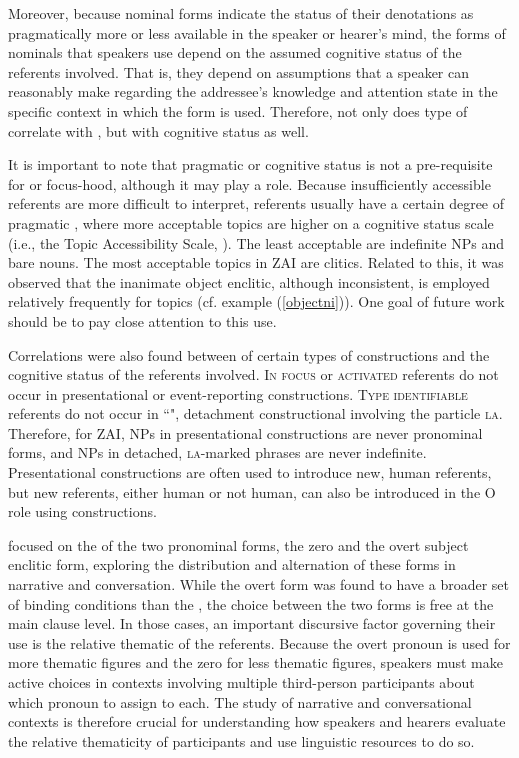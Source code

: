 Moreover, because nominal forms indicate the status of their denotations as pragmatically more or less available in the speaker or hearer's mind, the forms of nominals that speakers use depend on the assumed cognitive status of the referents involved. That is, they depend on assumptions that a speaker can reasonably make regarding the addressee's knowledge and attention state in the specific context in which the form is used. Therefore, not only does type of  correlate with , but with cognitive status as well. 

It is important to note that pragmatic or cognitive status is not a pre-requisite for  or focus-hood, although it may play a role. Because insufficiently accessible  referents are more difficult to interpret,  referents usually have a certain degree of pragmatic , where more acceptable topics are higher on a cognitive status scale (i.e., the Topic Accessibility Scale, \citealt{lambrecht1994}). The least acceptable are indefinite NPs and bare nouns. The most acceptable topics in ZAI are clitics. Related to this, it was observed that the inanimate object enclitic, although inconsistent, is employed relatively frequently for topics (cf. example (\ref{objectni})). One goal of future work should be to pay close attention to this use.

Correlations were also found between  of certain types of constructions and the cognitive status of the referents involved. \textsc{In focus} \citep{gundel1993} or \textsc{activated} referents do not occur in presentational or event-reporting constructions. \textsc{Type identifiable} referents do not occur in ``", detachment constructional involving the particle \textsc{la}. Therefore, for ZAI, NPs in presentational constructions are never pronominal forms, and NPs in detached, \textsc{la}-marked phrases are never indefinite. Presentational constructions are often used to introduce new, human referents, but new referents, either human or not human, can also be introduced in the O role using  constructions.

 focused on the  of the two  pronominal forms, the zero and the overt subject enclitic form, exploring the distribution and alternation of these forms in narrative and conversation. While the overt form was found to have a broader set of binding conditions than the , the choice between the two forms is free at the main clause level. In those cases, an important discursive factor governing their use is the relative thematic  of the referents. Because the overt pronoun is used for more thematic figures and the zero for less thematic figures, speakers must make active choices in contexts involving multiple third-person participants about which pronoun to assign to each. The study of narrative and conversational contexts is therefore crucial for understanding how speakers and hearers evaluate the relative thematicity of participants and use linguistic resources to do so.

